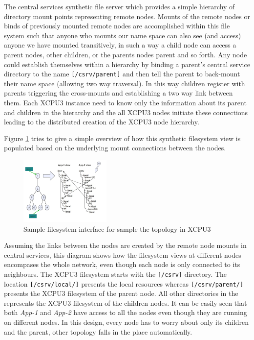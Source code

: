 \documentclass[conference]{IEEEtran}
\begin{document}
The central services synthetic file server which provides a simple hierarchy of
directory mount points representing remote nodes.  Mounts of the remote nodes
or binds of previously mounted remote nodes are accomplished within this file
system such that anyone who mounts our name space can also see (and
access) anyone we have mounted transitively,  in such a way a child
node can access a parent nodes, other children, or the parents nodes
parent and so forth. Any node could establish themselves within a
hierarchy by binding a parent's central service directory to the name
\texttt{[/csrv/parent]} and then tell the parent to back-mount their name space
(allowing two way traversal).  In this way children register with parents
triggering the cross-mounts and establishing a two way link between them. Each
XCPU3 instance need to know only the information about its parent and children
in the hierarchy and the all XCPU3 nodes initiate these connections leading to
the distributed creation of the XCPU3 node hierarchy.
 
Figure \ref{fig:xcpu3FSTopo} tries to give a simple overview of how this 
synthetic filesystem view is populated based on the underlying mount
connections between the nodes.

\begin{figure}[h]
  \begin{center}
    \leavevmode
      \includegraphics[height=0.3\textheight,width=0.4\textwidth]
		{./img/xcpu3FSTopo}
    \caption{Sample filesystem interface for sample the topology in XCPU3}
    \label{fig:xcpu3FSTopo}
  \end{center}
\end{figure}

Assuming the links between the nodes are created by the remote node mounts in
central services, this diagram shows how the filesystem views at different
nodes encompases the whole network, even though each node is only connected to
its neighbours. The XCPU3 filesystem starts with the \texttt{[/csrv]}
directory. The location \texttt{[/csrv/local/]} presents the local resources
whereas \texttt{[/csrv/parent/]} presents the XCPU3 filesystem of the parent
node. All other directories in the represents the XCPU3 filesystem of the
children nodes.  It can be easily seen that both \textit{App-1} and
\textit{App-2} have access to all the nodes even though they are running on
different nodes.  In this design, every node has to worry about only its
children and the parent, other topology falls in the place automatically.
\end{document}
